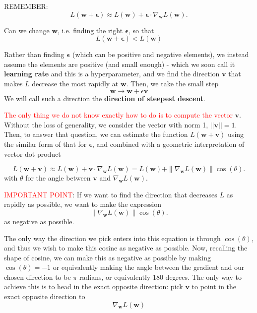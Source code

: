 REMEMBER:
$$
L(\mathbf{w} + \boldsymbol{\epsilon}) \approx L(\mathbf{w}) + \boldsymbol{\epsilon}\cdot \nabla_{\mathbf{w}} L(\mathbf{w}).
$$

Can we change $\mathbf{w}$, i.e. finding the right $\mathbf{\epsilon}$, so that
\begin{equation}
L(\mathbf{w} + \boldsymbol{\epsilon})  < L(\mathbf{w})
\end{equation}

Rather than finding $\mathbf{\epsilon}$ (which can be positive and negative
elements), we instead assume the elements are positive (and small enough) -
which we soon call it {\bf learning rate} and this is a hyperparameter, and we
find the direction $\mathbf{v}$ that makes $L$ decrease the most rapidly at
$\mathbf{w}$. Then, we take the small step
\begin{equation}
\mathbf{w} \rightarrow \mathbf{w} + \epsilon\mathbf{v}
\end{equation}
 We will call such a direction the {\bf direction of steepest descent}.

\textcolor{red}{The only thing we do not know exactly how to do is to compute
the vector} $\mathbf{v}$. Without the loss of generality, we consider the vector
with norm 1, $||\mathbf{v}|| = 1$. Then, to answer that question, we can
estimate the function $L(\mathbf{w} + \mathbf{v}) $ using the similar form of
that for $\boldsymbol{\epsilon}$, and combined with a geometric interpretation
of vector dot product


\begin{equation}
L(\mathbf{w} + \mathbf{v}) \approx L(\mathbf{w}) + \mathbf{v}\cdot \nabla_{\mathbf{w}} L(\mathbf{w}) = L(\mathbf{w}) + \|\nabla_{\mathbf{w}} L(\mathbf{w})\|\cos(\theta).
\end{equation}
with $\theta$ for the angle between $\mathbf{v}$ and $\nabla_{\mathbf{w}} L(\mathbf{w})$.  

\textcolor{red}{IMPORTANT POINT}: If we want to find the direction that
decreases $L$ as rapidly as possible, we want to make the expression 
\begin{equation}
\|\nabla_{\mathbf{w}} L(\mathbf{w})\|\cos(\theta).
\end{equation}
as negative as possible.
 
The only way the direction we pick enters into this equation is through
$\cos(\theta)$, and thus we wish to make this cosine as negative as possible. 
Now, recalling the shape of cosine, we can make this as negative as possible by
making $\cos(\theta) = -1$ or equivalently making the angle between the gradient
and our chosen direction to be $\pi$ radians, or equivalently $180$ degrees. 
The only way to achieve this is to head in the exact opposite direction:  pick
$\mathbf{v}$ to point in the exact opposite direction to 
\begin{equation}
\nabla_{\mathbf{w}} L(\mathbf{w})
\end{equation}


